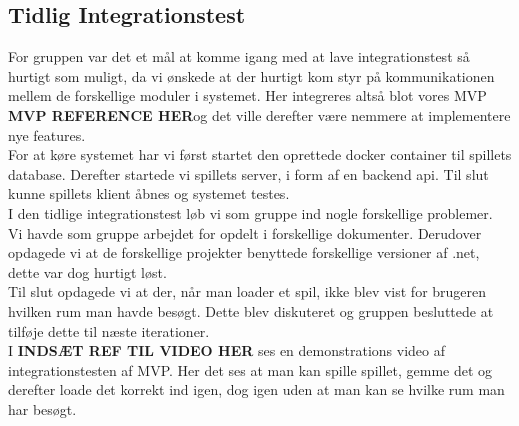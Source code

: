 \subsection{Tidlig Integrationstest}
For gruppen var det et mål at komme igang med at lave integrationstest så hurtigt som muligt, da vi ønskede at der hurtigt kom styr på kommunikationen mellem de forskellige moduler i systemet. Her integreres altså blot vores MVP \textbf{MVP REFERENCE HER}og det ville derefter være nemmere at implementere nye features.\\

\noindent For at køre systemet har vi først startet den oprettede docker container til spillets database. Derefter startede vi spillets server, i form af en backend api. Til slut kunne spillets klient åbnes og systemet testes.\\

\noindent I den tidlige integrationstest løb vi som gruppe ind nogle forskellige problemer.\\
Vi havde som gruppe arbejdet for opdelt i forskellige dokumenter. 
Derudover opdagede vi at de forskellige projekter benyttede forskellige versioner af .net, dette var dog hurtigt løst.\\
Til slut opdagede vi at der, når man loader et spil, ikke blev vist for brugeren hvilken rum man havde besøgt. Dette blev diskuteret og gruppen besluttede at tilføje dette til næste iterationer.\\

\noindent I \textbf{INDSÆT REF TIL VIDEO HER} ses en demonstrations video af integrationstesten af MVP. Her det ses at man kan spille spillet, gemme det og derefter loade det korrekt ind igen, dog igen uden at man kan se hvilke rum man har besøgt.
